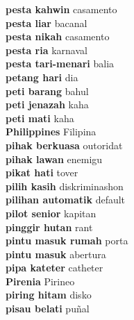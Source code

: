 \textbf{ pesta kahwin  } casamento \\
\textbf{ pesta liar  } bacanal \\
\textbf{ pesta nikah  } casamento \\
\textbf{ pesta ria  } karnaval \\
\textbf{ pesta tari-menari  } balia \\
\textbf{ petang hari  } dia \\
\textbf{ peti barang  } bahul \\
\textbf{ peti jenazah  } kaha \\
\textbf{ peti mati  } kaha \\
\textbf{ Philippines  } Filipina \\
\textbf{ pihak berkuasa  } outoridat \\
\textbf{ pihak lawan  } enemigu \\
\textbf{ pikat hati  } tover \\
\textbf{ pilih kasih  } diskriminashon \\
\textbf{ pilihan automatik  } default \\
\textbf{ pilot senior  } kapitan \\
\textbf{ pinggir hutan  } rant \\
\textbf{ pintu masuk rumah  } porta \\
\textbf{ pintu masuk  } abertura \\
\textbf{ pipa kateter  } catheter \\
\textbf{ Pirenia  } Pirineo \\
\textbf{ piring hitam  } disko \\
\textbf{ pisau belati  } puñal \\

